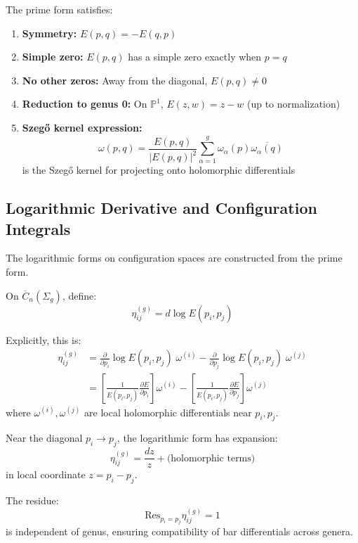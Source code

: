 \begin{theorem}
\label{thm:prime-form-properties}
The prime form satisfies:
\begin{enumerate}
\item \textbf{Symmetry:} $E(p, q) = -E(q, p)$
\item \textbf{Simple zero:} $E(p, q)$ has a simple zero exactly when $p = q$
\item \textbf{No other zeros:} Away from the diagonal, $E(p, q) \neq 0$
\item \textbf{Reduction to genus 0:} On $\mathbb{P}^1$, $E(z, w) = z - w$ (up to normalization)
\item \textbf{Szegő kernel expression:}
\begin{equation}
\omega(p, q) = \frac{E(p, q)}{|E(p, q)|^2} \sum_{\alpha=1}^g \omega_\alpha(p) \overline{\omega_\alpha(q)}
\end{equation}
is the Szegő kernel for projecting onto holomorphic differentials
\end{enumerate}
\end{theorem}

\subsection{Logarithmic Derivative and Configuration Integrals}

The logarithmic forms on configuration spaces are constructed from the prime form.

\begin{definition}
\label{def:log-forms-genus-g-complete}
On $\overline{C}_n(\Sigma_g)$, define:
\begin{equation}
\eta_{ij}^{(g)} = d \log E(p_i, p_j)
\end{equation}

Explicitly, this is:
\begin{align}
\eta_{ij}^{(g)} &= \frac{\partial}{\partial p_i} \log E(p_i, p_j) \; \omega^{(i)} - \frac{\partial}{\partial p_j} \log E(p_i, p_j) \; \omega^{(j)}\\
&= \left[\frac{1}{E(p_i, p_j)} \frac{\partial E}{\partial p_i}\right] \omega^{(i)} - \left[\frac{1}{E(p_i, p_j)} \frac{\partial E}{\partial p_j}\right] \omega^{(j)}
\end{align}
where $\omega^{(i)}, \omega^{(j)}$ are local holomorphic differentials near $p_i, p_j$.
\end{definition}

\begin{theorem}
\label{thm:residue-prime-form}
Near the diagonal $p_i \to p_j$, the logarithmic form has expansion:
\begin{equation}
\eta_{ij}^{(g)} = \frac{dz}{z} + \text{(holomorphic terms)}
\end{equation}
in local coordinate $z = p_i - p_j$.

The residue:
\begin{equation}
\text{Res}_{p_i = p_j} \eta_{ij}^{(g)} = 1
\end{equation}
is independent of genus, ensuring compatibility of bar differentials across genera.
\end{theorem}

